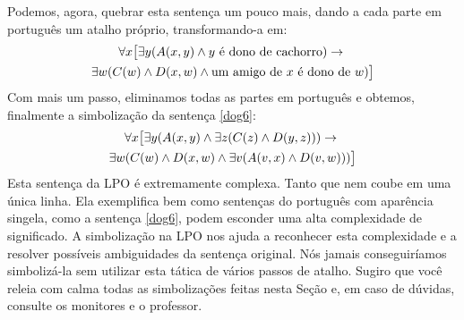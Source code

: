 \normalsize
\noindent Podemos, agora, quebrar esta sentença um pouco mais, dando a cada parte em português um atalho próprio, transformando-a em:
\begin{multline*}
	\forall x\bigl[\exists y(\mathord{A}(x,y) \wedge y\text{ é dono de cachorro})\rightarrow {}\\
\exists w(\mathord{C}(w) \wedge \mathord{D}(x,w) \wedge \text{um amigo de  $x$ é dono de }w)\bigr]
\end{multline*}
Com mais um passo, eliminamos todas as partes em português e obtemos, finalmente a simbolização da sentença \ref{dog6}: 
\begin{multline*}
\forall x\bigl[\exists y(\mathord{A}(x,y) \wedge \exists z(\mathord{C}(z) \wedge \mathord{D}(y,z))) \rightarrow {}\\
\exists w(\mathord{C}(w) \wedge \mathord{D}(x,w) \wedge \exists v(\mathord{A}(v,x) \wedge \mathord{D}(v,w)))\bigr]
\end{multline*}
Esta sentença da LPO é extremamente complexa.
Tanto que nem coube em uma única linha.
Ela exemplifica bem como sentenças do português com aparência singela, como a sentença \ref{dog6}, podem esconder uma alta complexidade de significado.
A simbolização na LPO nos ajuda a reconhecer esta complexidade e a resolver possíveis ambiguidades da sentença original.
Nós jamais conseguiríamos simbolizá-la sem utilizar esta tática de vários passos de atalho.
Sugiro que você releia com calma todas as simbolizações feitas nesta Seção e, em caso de dúvidas, consulte os monitores e o professor.


